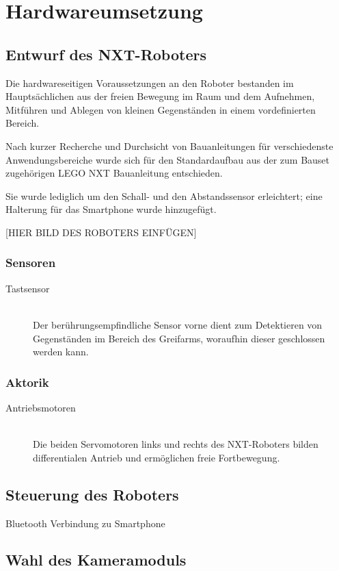 \chapter{Hardwareumsetzung}
\section{Entwurf des NXT-Roboters}

Die hardwareseitigen Voraussetzungen an den Roboter bestanden im Hauptsächlichen aus der freien Bewegung im Raum und dem Aufnehmen, Mitführen und Ablegen von kleinen Gegenständen in einem vordefinierten Bereich.

Nach kurzer Recherche\cite{building_instructions} und Durchsicht von Bauanleitungen für verschiedenste Anwendungsbereiche wurde sich für den Standardaufbau aus der zum Bauset zugehörigen LEGO NXT Bauanleitung entschieden.

Sie wurde lediglich um den Schall- und den Abstandssensor erleichtert; eine Halterung für das Smartphone wurde hinzugefügt.

[HIER BILD DES ROBOTERS EINFÜGEN]

\subsection{Sensoren}

\begin{description}
\item[Tastsensor]\hfill \\
Der berührungsempfindliche Sensor vorne dient zum Detektieren von Gegenständen im Bereich des Greifarms, woraufhin dieser geschlossen werden kann.
\end{description}

\subsection{Aktorik}

\begin{description}
\item[Antriebsmotoren]\hfill \\
Die beiden Servomotoren links und rechts des NXT-Roboters bilden differentialen Antrieb und ermöglichen freie Fortbewegung.
\end{description}

\section{Steuerung des Roboters}
Bluetooth Verbindung zu Smartphone

\section{Wahl des Kameramoduls}
\label{sec:Kamera}
